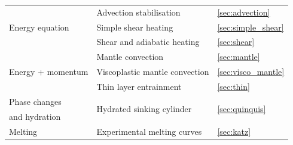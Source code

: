 \begin{table}[H]
\begin{tabular}{| l | l | l |}
\hline
  \multirow{3}{*}{Energy equation}  & Advection stabilisation & \ref{sec:advection} \\
    & Simple shear heating & \ref{sec:simple_shear} \\
    & Shear and adiabatic heating & \ref{sec:shear} \\
\hline
\multirow{3}{*}{Energy + momentum} & Mantle convection & \ref{sec:mantle} \\
& Viscoplastic mantle convection & \ref{sec:visco_mantle} \\
& Thin layer entrainment & \ref{sec:thin} \\
\hline
  Phase changes  & \multirow{2}{*}{Hydrated sinking cylinder} & \multirow{2}{*}{\ref{sec:quinquis}} \\
  and hydration  &  & \\
\hline
  Melting & Experimental melting curves & \ref{sec:katz} \\
\bottomrule
\end{tabular}
\label{tab:list}
\end{table}